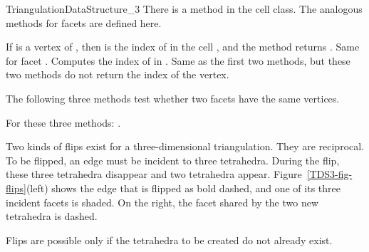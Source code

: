 \begin{ccRefConcept}{TriangulationDataStructure_3}
There is a method  in the cell class. The analogous
methods for facets are defined here.

{If  is a vertex of , then  is the index of
 in the cell , and the method returns .
}
\ccGlue
{}
{Same for facet . Computes the index  of  in
.}
\ccGlue
{}
{}
\ccGlue
{}
{Same as the first two methods, but these two methods do not return the
index of the vertex.}

The following three methods test whether two facets have the same
vertices.

{}
\ccGlue
{}
{}
\ccGlue
{}
{For these three methods: .}


Two kinds of flips exist for a three-dimensional triangulation. They
are reciprocal. To be flipped, an edge must be incident to three
tetrahedra. During the flip, these three tetrahedra disappear and two
tetrahedra appear. Figure~\ref{TDS3-fig-flips}(left) shows the
edge that is flipped as bold dashed, and one of its three incident
facets is shaded. On the right, the facet shared by the two new
tetrahedra is dashed. 

Flips are possible only if the tetrahedra to be created do not already 
exist.


\end{ccRefConcept}
